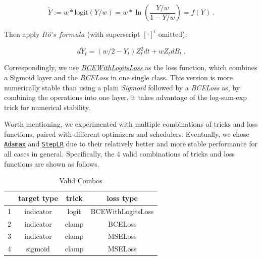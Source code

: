 \documentclass[a4paper,10pt]{article}
\newcommand{\1}{\mathbf{1}}
\begin{document}
\begin{equation}
   \tilde{Y} := w*\text{logit} (Y/w) = w*\ln\left(\frac{Y/w}{1-Y/w}\right)=f(Y)~. 
\end{equation}

Then apply \(\textit{It}\hat{o} \textit{'s formula}\) (with
superscript \([\cdot]^i\) omitted):

\begin{equation}
    d \tilde{Y}_t = (w/2-Y_t)Z_t^2dt + wZ_tdB_t~.
\end{equation} 

Correspondingly, we use \href{https://pytorch.org/docs/stable/generated/torch.nn.BCEWithLogitsLoss.html}{\textit{BCEWithLogitsLoss}} as the loss function, which combines a Sigmoid layer and the \textit{BCELoss} in one single class. This version is more numerically stable than using a plain \textit{Sigmoid} followed by a  \textit{BCELoss} as, by combining the operations into one layer, it takes advantage of the log-sum-exp trick for numerical stability.

Worth mentioning, we experimented with multiple combinations of tricks
and loss functions, paired with different optimizers and schedulers.
Eventually, we chose
\href{https://pytorch.org/docs/stable/generated/torch.optim.Adamax.html}{\texttt{Adamax}}
and
\href{https://pytorch.org/docs/stable/generated/torch.optim.lr_scheduler.StepLR.html}{\texttt{StepLR}}
due to their relatively better and more stable performance for all cases
in general. Specifically, the 4 valid combinations of tricks and
loss functions are shown as follows.

\begin{table}[ht]
    \centering
    \begin{tabular}{*{4}{c}}
        \toprule
        \, & \textbf{target type} & \textbf{trick} & \textbf{loss type} \\
        \midrule
        1 & indicator & logit & BCEWithLogitsLoss \\
        2 & indicator & clamp & BCELoss \\
        3 & indicator & clamp & MSELoss \\
        4 & sigmoid   & clamp & MSELoss \\
        \toprule
    \end{tabular}
    \caption{Valid Combos}
    \label{tab:valid-combos}
\end{table}

\vspace{-5pt}
\end{document}
